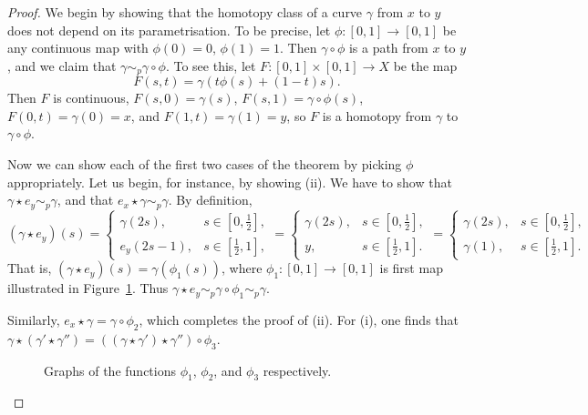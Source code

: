 \begin{proof}
  We begin by showing that the homotopy class of a curve $\gamma$ from $x$ to $y$ does not depend on its parametrisation. To be precise, let $\phi : [0,1] \to [0,1]$ be any continuous map with $\phi(0) = 0$, $\phi(1) = 1$. Then $\gamma \circ \phi$ is a path from $x$ to $y$, and we claim that $\gamma \sim_p \gamma \circ \phi$. To see this, let $F : [0,1] \times [0,1] \to X$ be the map
  \[
    F(s,t) = \gamma(t\phi(s) + (1-t)s).
  \]
  Then $F$ is continuous, $F(s,0) = \gamma(s)$, $F(s,1) = \gamma \circ \phi(s)$, $F(0,t) = \gamma(0) = x$, and $F(1,t) = \gamma(1) = y$, so $F$ is a homotopy from $\gamma$ to $\gamma \circ \phi$.
  
  Now we can show each of the first two cases of the theorem by picking $\phi$ appropriately. Let us begin, for instance, by showing (ii). We have to show that $\gamma \star e_y \sim_p \gamma$, and that $e_x \star \gamma \sim_p \gamma$. By definition,
  \[
    (\gamma \star e_y) (s) = \begin{cases} \gamma(2s), & s \in [0,\tfrac{1}{2}], \\ e_y(2s-1), & s \in [\tfrac{1}{2},1], \end{cases} = \begin{cases} \gamma(2s), & s \in [0,\tfrac{1}{2}], \\ y, & s \in [\tfrac{1}{2},1]. \end{cases} = \begin{cases} \gamma(2s), & s \in [0,\tfrac{1}{2}], \\ \gamma(1), & s \in [\tfrac{1}{2},1]. \end{cases}
  \]
  That is, $(\gamma \star e_y)(s) = \gamma(\phi_1(s))$, where $\phi_1 : [0,1] \to [0,1]$ is first map illustrated in Figure~\ref{graph-reparametrisation}. Thus $\gamma \star e_y \sim_p \gamma \circ \phi_1 \sim_p \gamma$.
  
  Similarly, $e_x \star \gamma = \gamma \circ \phi_2$, which completes the proof of (ii). For (i), one finds that $\gamma \star (\gamma' \star \gamma'') = ((\gamma \star \gamma' ) \star \gamma'') \circ \phi_3$.
  \begin{figure}
    \centering
    \quad
    \quad
    \caption{Graphs of the functions $\phi_1$, $\phi_2$, and $\phi_3$ respectively.}
    \label{graph-reparametrisation}
  \end{figure}
  

\end{proof}
